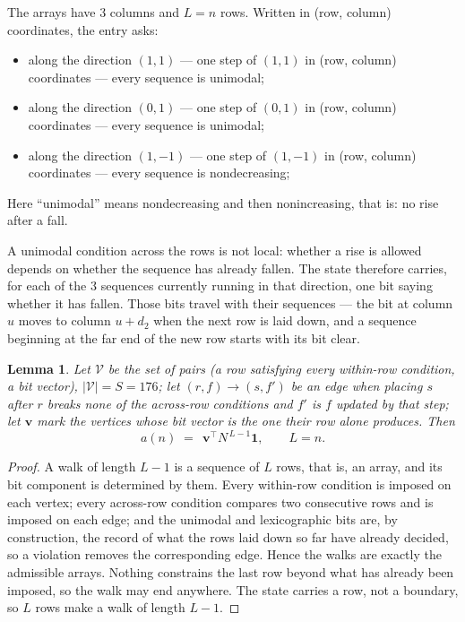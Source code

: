 \documentclass[11pt,a4paper]{article}
\theoremstyle{plain}
\newtheorem{lemma}[theorem]{Lemma}
\theoremstyle{definition}
\begin{document}
The arrays have $3$ columns and $L=n$ rows. Written in (row, column)
coordinates, the entry asks:
\begin{itemize}
\item along the direction $(1,1)$ --- one step of $(1,1)$ in (row, column) coordinates --- every sequence is unimodal;
\item along the direction $(0,1)$ --- one step of $(0,1)$ in (row, column) coordinates --- every sequence is unimodal;
\item along the direction $(1,-1)$ --- one step of $(1,-1)$ in (row, column) coordinates --- every sequence is nondecreasing;
\end{itemize}
Here ``unimodal'' means nondecreasing and then nonincreasing, that is: no rise after a fall.

A unimodal condition across the rows is not local: whether a
rise is allowed depends on whether the sequence has already fallen. The state therefore
carries, for each of the $3$ sequences currently running in that direction, one bit saying
whether it has fallen. Those bits travel with their sequences --- the bit at column $u$
moves to column $u+d_2$ when the next row is laid down, and a sequence beginning at the
far end of the new row starts with its bit clear.

\begin{lemma}\label{lem:walk}
Let $\mathcal V$ be the set of pairs (a row satisfying every within-row condition, a
bit vector), $|\mathcal V|=S=176$; let $(r,f)\to(s,f')$ be an edge when placing $s$ after $r$
breaks none of the across-row conditions and $f'$ is $f$ updated by that step; let
$\mathbf{v}$ mark the vertices whose bit vector is the one their row alone produces.
Then
\[
a(n)\;=\;\,\mathbf{v}^{\!\top}N^{\,L-1}\mathbf{1},\qquad L=n.
\]
\end{lemma}

\begin{proof}
A walk of length $L-1$ is a sequence of $L$ rows, that is, an array, and its bit component
is determined by them. Every within-row condition is imposed on each vertex; every
across-row condition compares two consecutive rows and is imposed on each edge; and the
unimodal and lexicographic bits are, by construction, the record of what the rows laid down
so far have already decided, so a violation removes the corresponding edge. Hence the walks
are exactly the admissible arrays. Nothing constrains the last row beyond what has already
been imposed, so the walk may end anywhere. The state carries a row, not a boundary, so
$L$ rows make a walk of length $L-1$.
\end{proof}
\end{document}
